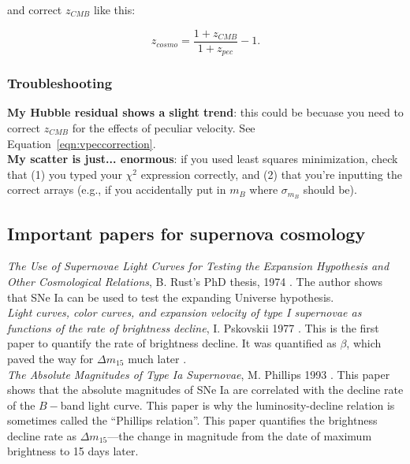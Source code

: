 and correct $z_{CMB}$ like this:

\begin{equation}
\label{eqn:vpeccorrection}
    z_{cosmo} = \frac{1 + z_{CMB}}{1 + z_{pec}} - 1.
\end{equation}

\subsubsection{Troubleshooting}
\textbf{My Hubble residual shows a slight trend}: this could be becuase you need to correct $z_{CMB}$ for the effects of peculiar velocity. See Equation~\ref{eqn:vpeccorrection}.\\

\noindent\textbf{My scatter is just... enormous}: if you used least squares minimization, check that (1) you typed your $\chi^{2}$ expression correctly, and (2) that you're inputting the correct arrays (e.g., if you accidentally put in $m_{B}$ where $\sigma_{m_{B}}$ should be). 

\subsection{Important papers for supernova cosmology}

\textit{The Use of Supernovae Light Curves for Testing the Expansion Hypothesis and Other Cosmological Relations}, B. Rust's PhD thesis, 1974 \cite{Rust1974}. The author shows that SNe Ia can be used to test the expanding Universe hypothesis.\\

\noindent\textit{Light curves, color curves, and expansion velocity of type I supernovae as functions of the rate of brightness decline}, I. Pskovskii 1977 \cite{Pskovskii1977}. This is the first paper to quantify the rate of brightness decline. It was quantified as $\beta$, which paved the way for $\Delta m_{15}$ much later \cite{Phillips1993}. \\

\noindent\textit{The Absolute Magnitudes of Type Ia Supernovae}, M. Phillips 1993 \cite{Phillips1993}. This paper shows that the absolute magnitudes of SNe Ia are correlated with the decline rate of the $B-$band light curve. This paper is why the luminosity-decline relation is sometimes called the ``Phillips relation''. This paper quantifies the brightness decline rate as $\Delta m_{15}$---the change in magnitude from the date of maximum brightness to 15 days later.\\

